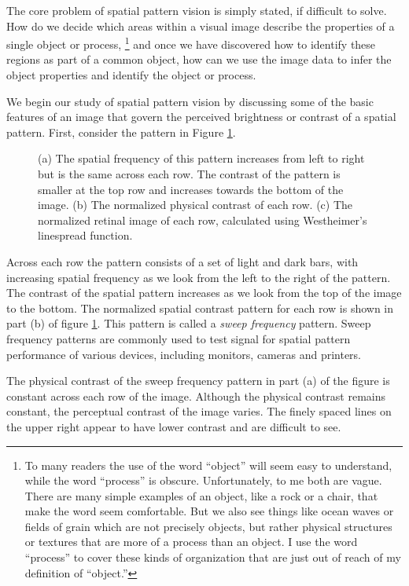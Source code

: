 The core problem of spatial pattern vision
is simply stated, if difficult to solve.
How do we decide which areas within a visual image
describe the properties of a single object or process,
\footnote{
To many readers the use of the word ``object'' will seem
easy to understand, while the word ``process'' is obscure.
Unfortunately, to me both are vague.
There are many simple examples
of an object, like a rock or a chair, that make
the word seem comfortable.
But we also see things like ocean waves or fields of grain which
are not precisely objects, but rather physical
structures or textures that are more of a process
than an object.
I use the word ``process'' to cover
these kinds of organization that are just out of reach
of my definition of ``object.''
}
and once we have discovered how to identify
these regions as part of a common object,
how can we use the image data to infer the object
properties and identify the object or process.

We begin our study of spatial pattern vision by
discussing some of the basic features of an
image that govern the perceived brightness
or contrast of a spatial pattern.
First, consider the pattern in Figure \ref{fig4:sweep}.
\begin{figure}
\centerline{
}
\centerline{
}
\centerline{
}
\caption{
(a) The spatial frequency of this pattern increases from
left to right but is the same across each row.
The contrast of the pattern is smaller at the top row
and increases towards the bottom of the image.
(b) The normalized physical contrast of each row.
(c) The normalized retinal image of each row, calculated using
Westheimer's linespread function.
}
\label{fig4:sweep}
\end{figure}
Across each row the pattern
consists of a set of light and dark bars, 
with increasing spatial frequency as we look from the left
to the right of the pattern.
The contrast of the spatial pattern increases as we look
from the top of the image to the bottom.
The normalized spatial contrast pattern for each row is
shown in part (b) of figure \ref{fig4:sweep}.
This pattern is called a {\em sweep frequency} pattern.
Sweep frequency patterns are commonly used to
test signal for spatial pattern performance of various
devices, including monitors, cameras and printers.

The physical contrast of the sweep frequency pattern in part (a)
of the figure is constant across each row of the image.
Although the physical contrast remains constant,
the perceptual contrast of the image varies.
The finely spaced lines on the upper right appear
to have lower contrast and are difficult to see.

